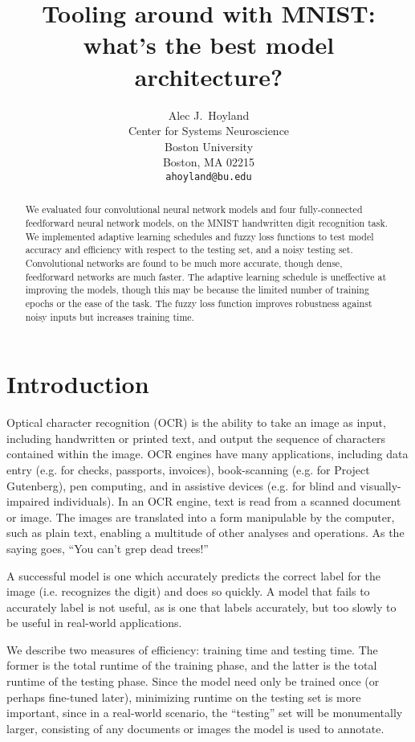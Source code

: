 \documentclass{article}
\title{Tooling around with MNIST: what's the best model architecture?}
\author{%
  Alec J.~Hoyland \\
  Center for Systems Neuroscience\\
  Boston University\\
  Boston, MA 02215 \\
  \texttt{ahoyland@bu.edu} \\
}
\begin{document}
\maketitle

\begin{abstract}
  We evaluated four convolutional neural network models and four fully-connected feedforward neural network models,
  on the MNIST handwritten digit recognition task.
  We implemented adaptive learning schedules and fuzzy loss functions to test model accuracy and efficiency
  with respect to the testing set, and a noisy testing set.
  Convolutional networks are found to be much more accurate, though dense, feedforward networks are much faster.
  The adaptive learning schedule is uneffective at improving the models,
  though this may be because the limited number of training epochs or the ease of the task.
  The fuzzy loss function improves robustness against noisy inputs but increases training time.
\end{abstract}

\section{Introduction}

Optical character recognition (OCR) is the ability to take an image as input, including handwritten or printed text,
and output the sequence of characters contained within the image.
OCR engines have many applications, including data entry (e.g. for checks, passports, invoices),
book-scanning (e.g. for Project Gutenberg), pen computing, and in assistive devices
(e.g. for blind and visually-impaired individuals).
In an OCR engine, text is read from a scanned document or image.
The images are translated into a form manipulable by the computer, such as plain text,
enabling a multitude of other analyses and operations.
As the saying goes, ``You can't grep dead trees!''

A successful model is one which accurately predicts the correct label for the image
(i.e. recognizes the digit) and does so quickly.
A model that fails to accurately label is not useful, as is one that labels accurately,
but too slowly to be useful in real-world applications.

We describe two measures of efficiency:
training time and testing time.
The former is the total runtime of the training phase,
and the latter is the total runtime of the testing phase.
Since the model need only be trained once (or perhaps fine-tuned later),
minimizing runtime on the testing set is more important,
since in a real-world scenario, the ``testing'' set will be monumentally larger,
consisting of any documents or images the model is used to annotate.
\end{document}
